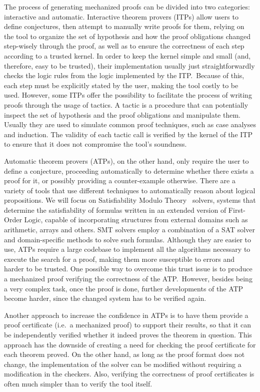 The process of generating mechanized proofs can be divided
into two categories: interactive and automatic.
Interactive theorem provers (ITPs) allow users to define
conjectures, then attempt to manually write proofs for them,
relying on the tool to organize the set of hypothesis and
how the proof obligations changed step-wisely through the
proof, as well as to ensure the correctness of each step
according to a trusted kernel.
%
In order to keep the kernel simple and small (and, therefore,
easy to be trusted), their implementation usually just
straightforwardly checks the logic rules from the logic
implemented by the ITP.\ Because of this, each step must be
explicitly stated by the user, making the tool costly to be
used. However, some ITPs offer the possibility to facilitate
the process of writing proofs through the usage of tactics.
A tactic is a procedure that can potentially inspect the
set of hypothesis and the proof obligations and manipulate
them. Usually they are used to simulate common proof
techniques, such as case analyses and induction. The
validity of each tactic call is verified by the kernel
of the ITP to ensure that it does not compromise the tool's
soundness.

Automatic theorem provers (ATPs), on the other hand,
only require the user to define a conjecture, proceeding
automatically to determine whether there exists a proof
for it, or possibly providing a counter-example otherwise.
%
There are a variety of tools that use different
techniques to automatically reason about logical propositions.
We will focus on Satisfiability Modulo Theory~\cite[ch. 33]{handbook} solvers, systems
that determine the satisfiability of formulas written in an
extended version of First-Order Logic,
capable of incorporating structures from external domains such as arithmetic,
arrays and others. SMT solvers employ a combination of a SAT solver and
domain-specific methods to solve such formulas.
%
Although they are easier to use, ATPs require a large
codebase to implement all the algorithms necessary to execute
the search for a proof, making them more susceptible to
errors and harder to be trusted. One possible way to overcome
this trust issue is to produce a mechanized proof verifying
the correctness of the ATP.\ However, besides being a very
complex task, once the proof is done, further developments of
the ATP become harder, since the changed system has to be
verified again.

Another approach to increase the confidence in ATPs is to have them provide a
proof certificate (i.e.\ a mechanized proof) to support their results, so that it can be independently verified whether
it indeed proves the theorem in question. This approach has the downside of creating a need
for checking the proof certificate for each theorem proved.
On the other hand, as long as the proof format does not change, the implementation
of the solver can be modified without requiring a modification in the checkers. Also,
verifying the correctness of proof certificates is often much simpler than to verify
the tool itself.

